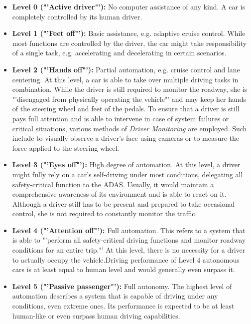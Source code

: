 \begin{samepage}
\begin{itemize}
	\item \textbf{Level 0 ("'Active driver"'):} No computer assistance of any kind. A car is completely controlled by its human driver.
	\item \textbf{Level 1 ("'Feet off"'):} Basic assistance, e.g. adaptive cruise control. While most functions are controlled by the driver, the car might take responsibility of a single task, e.g. accelerating and decelerating in certain scenarios.
	\item \textbf{Level 2 ("'Hands off"'):} Partial automation, e.g. cruise control and lane centering. At this level, a car is able to take over multiple driving tasks in combination. While the driver is still required to monitor the roadway, she is "'disengaged from physically operating the vehicle"' \cite{Klein} and may keep her hands of the steering wheel and feet of the pedals. To ensure that a driver is still pays full attention and is able to intervene in case of system failures or critical situations, various methods of \textit{Driver Monitoring} are employed. Such include to visually observe a driver's face using cameras or to measure the force applied to the steering wheel.
	\item \textbf{Level 3 ("'Eyes off"'):} High degree of automation. At this level, a driver might fully rely on a car's self-driving under most conditions, delegating all safety-critical function to the ADAS. Usually, it would maintain a comprehensive awareness of its environment and is able to react on it. Although a driver still has to be present and prepared to take occasional control, she is not required to constantly monitor the traffic. 
	\item \textbf{Level 4 ("'Attention off"'):} Full automation. This refers to a system that is able to "'perform all safety-critical driving functions and monitor roadway conditions for an entire trip."' \cite{2016transportation} At this level, there is no necessity for a driver to actually occupy the vehicle.Driving performance of Level 4 autonomous cars is at least equal to human level and would generally even surpass it. 
	\item \textbf{Level 5 ("'Passive passenger"'):} Full autonomy. The highest level of automation describes a system that is capable of driving under any conditions, even extreme ones. Its performance is expected to be at least human-like or even surpass human driving capabilities. 
\end{itemize}
\end{samepage}



